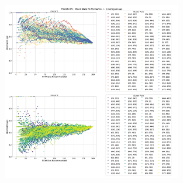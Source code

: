 \documentclass[a4paper,fontsize=8.0pt]{scrartcl}
\begin{document}
\begin{figure}[H]
 \includegraphics[width=0.7\textwidth]{Graphs/GLOVE/user_interaction_vs_model_performance_precision_all_cps_mixed_data_sep_Heterogeneous.pdf}
\end{figure}
\end{document}
